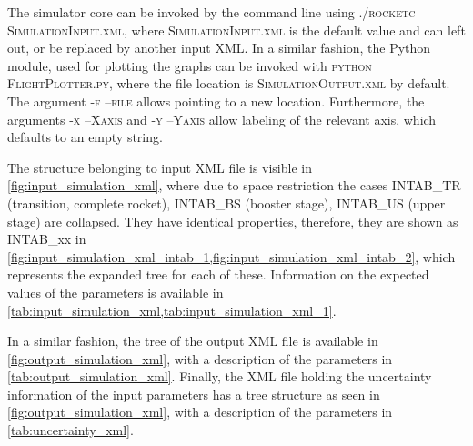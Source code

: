 \documentclass[11pt, a4paper]{article}
\newcommand{\loc}[1]{{\footnotesize \textsc{#1}}}
\begin{document}
The simulator core can be invoked by the command line using \loc{./rocketc SimulationInput.xml}, where \loc{SimulationInput.xml} is the default value and can left out, or be replaced by another input XML.
%
In a similar fashion, the Python module, used for plotting the graphs can be invoked with \loc{python FlightPlotter.py}, where the file location is \loc{SimulationOutput.xml} by default. The argument \loc{-f --file} allows pointing to a new location. Furthermore, the arguments \loc{-x --Xaxis} and \loc{-y --Yaxis} allow labeling of the relevant axis, which defaults to an empty string.

The structure belonging to input XML file is visible in \cref{fig:input_simulation_xml}, where due to space restriction the cases {INTAB\_TR} (transition, complete rocket), {INTAB\_BS} (booster stage), {INTAB\_US} (upper stage) are collapsed. They have identical properties, therefore, they are shown as {INTAB\_xx} in \cref{fig:input_simulation_xml_intab_1,fig:input_simulation_xml_intab_2}, which represents the expanded tree for each of these.
Information on the expected values of the parameters is available in \cref{tab:input_simulation_xml,tab:input_simulation_xml_1}.

In a similar fashion, the tree of the output XML file is available in \cref{fig:output_simulation_xml}, with a description of the parameters in \cref{tab:output_simulation_xml}.
Finally, the XML file holding the uncertainty information of the input parameters has a tree structure as seen in \cref{fig:output_simulation_xml}, with a description of the parameters in \cref{tab:uncertainty_xml}.
\end{document}
